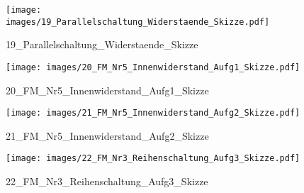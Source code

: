 %
%
\begin{figure}[!hb]%
    \centering
  \texttt{[image: images/19\_Parallelschaltung\_Widerstaende\_Skizze.pdf]}%
  \caption{19_Parallelschaltung_Widerstaende_Skizze}%
\end{figure}

%
%
\begin{figure}[!hb]%
    \centering
  \texttt{[image: images/20\_FM\_Nr5\_Innenwiderstand\_Aufg1\_Skizze.pdf]}%
  \caption{20_FM_Nr5_Innenwiderstand_Aufg1_Skizze}%
\end{figure}

%
%
\begin{figure}[!hb]%
    \centering
  \texttt{[image: images/21\_FM\_Nr5\_Innenwiderstand\_Aufg2\_Skizze.pdf]}%
  \caption{21_FM_Nr5_Innenwiderstand_Aufg2_Skizze}%
\end{figure}

%
%
\begin{figure}[!hb]%
    \centering
  \texttt{[image: images/22\_FM\_Nr3\_Reihenschaltung\_Aufg3\_Skizze.pdf]}%
  \caption{22_FM_Nr3_Reihenschaltung_Aufg3_Skizze}%
\end{figure}

